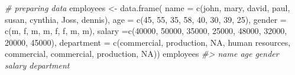 \documentclass[
]{book}
\newenvironment{Shaded}{\begin{snugshade}}{\end{snugshade}}
\newcommand{\AttributeTok}[1]{\textcolor[rgb]{0.77,0.63,0.00}{#1}}
\newcommand{\CommentTok}[1]{\textcolor[rgb]{0.56,0.35,0.01}{\textit{#1}}}
\newcommand{\ConstantTok}[1]{\textcolor[rgb]{0.00,0.00,0.00}{#1}}
\newcommand{\DecValTok}[1]{\textcolor[rgb]{0.00,0.00,0.81}{#1}}
\newcommand{\FunctionTok}[1]{\textcolor[rgb]{0.00,0.00,0.00}{#1}}
\newcommand{\NormalTok}[1]{#1}
\newcommand{\OtherTok}[1]{\textcolor[rgb]{0.56,0.35,0.01}{#1}}
\newcommand{\StringTok}[1]{\textcolor[rgb]{0.31,0.60,0.02}{#1}}
\begin{document}
\begin{Shaded}
\begin{Highlighting}[]
\CommentTok{\# preparing data}
\NormalTok{employees }\OtherTok{\textless{}{-}} \FunctionTok{data.frame}\NormalTok{(}
  \AttributeTok{name =} \FunctionTok{c}\NormalTok{(}\StringTok{\textquotesingle{}john\textquotesingle{}}\NormalTok{, }\StringTok{\textquotesingle{}mary\textquotesingle{}}\NormalTok{, }\StringTok{\textquotesingle{}david\textquotesingle{}}\NormalTok{, }\StringTok{\textquotesingle{}paul\textquotesingle{}}\NormalTok{, }\StringTok{\textquotesingle{}susan\textquotesingle{}}\NormalTok{, }\StringTok{\textquotesingle{}cynthia\textquotesingle{}}\NormalTok{, }\StringTok{\textquotesingle{}Joss\textquotesingle{}}\NormalTok{, }\StringTok{\textquotesingle{}dennis\textquotesingle{}}\NormalTok{),}
  \AttributeTok{age =} \FunctionTok{c}\NormalTok{(}\DecValTok{45}\NormalTok{, }\DecValTok{55}\NormalTok{, }\DecValTok{35}\NormalTok{, }\DecValTok{58}\NormalTok{, }\DecValTok{40}\NormalTok{, }\DecValTok{30}\NormalTok{, }\DecValTok{39}\NormalTok{, }\DecValTok{25}\NormalTok{),}
  \AttributeTok{gender =} \FunctionTok{c}\NormalTok{(}\StringTok{\textquotesingle{}m\textquotesingle{}}\NormalTok{, }\StringTok{\textquotesingle{}f\textquotesingle{}}\NormalTok{, }\StringTok{\textquotesingle{}m\textquotesingle{}}\NormalTok{, }\StringTok{\textquotesingle{}m\textquotesingle{}}\NormalTok{, }\StringTok{\textquotesingle{}f\textquotesingle{}}\NormalTok{, }\StringTok{\textquotesingle{}f\textquotesingle{}}\NormalTok{, }\StringTok{\textquotesingle{}m\textquotesingle{}}\NormalTok{, }\StringTok{\textquotesingle{}m\textquotesingle{}}\NormalTok{),}
  \AttributeTok{salary =}\FunctionTok{c}\NormalTok{(}\DecValTok{40000}\NormalTok{, }\DecValTok{50000}\NormalTok{, }\DecValTok{35000}\NormalTok{, }\DecValTok{25000}\NormalTok{, }\DecValTok{48000}\NormalTok{, }\DecValTok{32000}\NormalTok{, }\DecValTok{20000}\NormalTok{, }\DecValTok{45000}\NormalTok{),}
  \AttributeTok{department =} \FunctionTok{c}\NormalTok{(}\StringTok{\textquotesingle{}commercial\textquotesingle{}}\NormalTok{, }\StringTok{\textquotesingle{}production\textquotesingle{}}\NormalTok{, }\ConstantTok{NA}\NormalTok{, }\StringTok{\textquotesingle{}human resources\textquotesingle{}}\NormalTok{, }
                 \StringTok{\textquotesingle{}commercial\textquotesingle{}}\NormalTok{, }\StringTok{\textquotesingle{}commercial\textquotesingle{}}\NormalTok{, }\StringTok{\textquotesingle{}production\textquotesingle{}}\NormalTok{, }\ConstantTok{NA}\NormalTok{))}
\NormalTok{employees}
\CommentTok{\#\textgreater{}      name age gender salary      department}

\end{Highlighting}
\end{Shaded}
\end{document}
